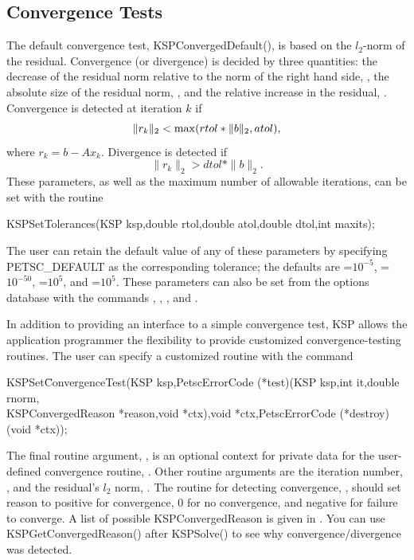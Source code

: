 \subsection{Convergence Tests}
\label{section_convergencetests}

The default convergence test, KSPConvergedDefault(), is
based on the $l_2$-norm of the residual. Convergence
(or divergence) is decided by three quantities:
the decrease of the residual norm relative to the norm of the right hand side, , the absolute
size of the residual norm, , and the relative increase in the
residual, .  Convergence is detected at iteration $ k $ if
\[  \| r_k \|_2 < {\rm max} ( rtol * \| b \|_2, atol), \]
where $r_k = b - A x_k$.  Divergence is detected if
\[  \| r_k \|_2 > dtol * \| b \|_2. \]
These parameters, as well as the maximum number of allowable iterations,
can be set with the routine
\begin{tabbing}
  KSPSetTolerances(KSP ksp,double rtol,double atol,double dtol,int maxits);
\end{tabbing}
The user can retain the default value of any of these parameters by
specifying PETSC\_DEFAULT as the
corresponding tolerance; the
defaults are =$10^{-5}$, =$10^{-50}$,
=$10^{5}$, and =$10^5$.
These parameters can also be set from the options database with the
commands  ,  ,  ,
  
and  . 

In addition to providing an interface to a simple convergence test,
KSP allows the application programmer the flexibility to provide
customized convergence-testing routines.  
The user can specify a customized
routine with the command
\begin{tabbing}
  KSPSet\=ConvergenceTest(KSP ksp,PetscErrorCode (*test)(KSP ksp,int it,double rnorm,\\
          \>KSPConvergedReason *reason,void *ctx),void *ctx,PetscErrorCode (*destroy)(void *ctx));
\end{tabbing}
The final routine argument, , is an optional context for private
data for the user-defined convergence routine, .  Other
 routine arguments are the iteration
number, , and the residual's $ l_2 $ norm, .
The routine for detecting convergence, , should set reason to
positive for convergence, 0 for no convergence, and negative for
failure to converge.  A list of possible KSPConvergedReason is given
in .
 You can use KSPGetConvergedReason() after KSPSolve() to see why
convergence/divergence was detected.

